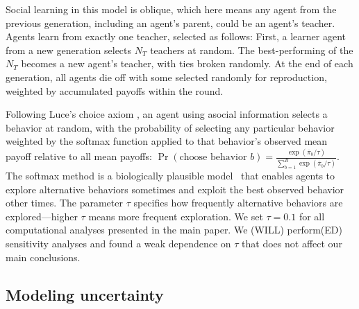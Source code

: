 \documentclass[letterpaper,11.5pt]{scrartcl}
\begin{document}
Social learning in this model is oblique, which here means
any agent from the previous generation, including an agent's parent,
could be an agent's teacher. 
Agents learn from exactly one teacher, selected as follows:
First, a learner agent from a new generation selects $N_T$ teachers at random.
The best-performing of the $N_T$ becomes a new agent's teacher, with ties broken
randomly. At the end of each generation, all agents die off with some selected
randomly for reproduction, weighted by accumulated payoffs within the round. 

Following Luce's choice axiom \cite{Luce1959}, an agent using asocial information selects a behavior at random, with the probability of selecting any particular behavior weighted by the softmax function applied to that behavior's observed mean payoff relative to all 
mean payoffs: 
$\Pr(\text{choose behavior }b) = 
  \frac{\exp(\bar\pi_b / \tau) }{ 
\sum_{b=1}^B \exp(\bar\pi_b / \tau)}$.
The softmax method is a biologically plausible model~\cite{Schulz2019} that enables agents to explore alternative behaviors sometimes and exploit the best observed behavior other times.  The parameter $\tau$ specifies
how frequently alternative behaviors are explored---higher $\tau$ means more
frequent exploration. We set $\tau = 0.1$ for all computational analyses 
presented in the main paper. We (WILL) perform(ED) sensitivity analyses 
and found a weak dependence on $\tau$ that does not affect our main conclusions.


\subsection{Modeling uncertainty}
\end{document}
